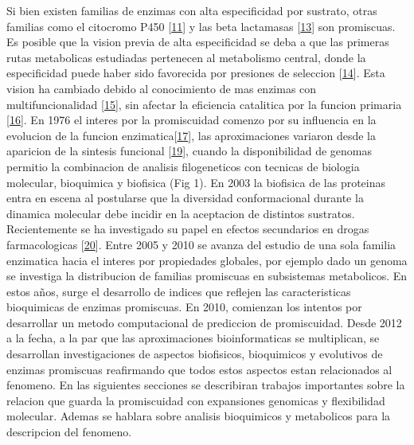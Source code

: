 \documentclass[12pt,twoside]{reedthesis}
\begin{document}
  Si bien existen familias de enzimas con alta especificidad por sustrato,
  otras familias como el citocromo P450
  {[}\protect\hyperlink{ref-bloom_neutral_2007}{11}{]} y las beta
  lactamasas {[}\protect\hyperlink{ref-zou_evolution_2015}{13}{]} son
  promiscuas. Es posible que la vision previa de alta especificidad se
  deba a que las primeras rutas metabolicas estudiadas pertenecen al
  metabolismo central, donde la especificidad puede haber sido favorecida
  por presiones de seleccion
  {[}\protect\hyperlink{ref-firn_darwinian_2009}{14}{]}. Esta vision ha
  cambiado debido al conocimiento de mas enzimas con multifuncionalidad
  {[}\protect\hyperlink{ref-jia_multifunctional_2013}{15}{]}, sin afectar
  la eficiencia catalitica por la funcion primaria
  {[}\protect\hyperlink{ref-aharoni_evolvability_2005}{16}{]}. En 1976 el
  interes por la promiscuidad comenzo por su influencia en la evolucion de
  la funcion
  enzimatica{[}\protect\hyperlink{ref-jensen_enzyme_1976}{17}{]}, las
  aproximaciones variaron desde la aparicion de la sintesis funcional
  {[}\protect\hyperlink{ref-dean_mechanistic_2007}{19}{]}, cuando la
  disponibilidad de genomas permitio la combinacion de analisis
  filogeneticos con tecnicas de biologia molecular, bioquimica y biofisica
  (Fig 1). En 2003 la biofisica de las proteinas entra en escena al
  postularse que la diversidad conformacional durante la dinamica
  molecular debe incidir en la aceptacion de distintos sustratos.
  Recientemente se ha investigado su papel en efectos secundarios en
  drogas farmacologicas
  {[}\protect\hyperlink{ref-nobeli_protein_2009}{20}{]}. Entre 2005 y 2010
  se avanza del estudio de una sola familia enzimatica hacia el interes
  por propiedades globales, por ejemplo dado un genoma se investiga la
  distribucion de familias promiscuas en subsistemas metabolicos. En estos
  años, surge el desarrollo de indices que reflejen las caracteristicas
  bioquimicas de enzimas promiscuas. En 2010, comienzan los intentos por
  desarrollar un metodo computacional de prediccion de promiscuidad. Desde
  2012 a la fecha, a la par que las aproximaciones bioinformaticas se
  multiplican, se desarrollan investigaciones de aspectos biofisicos,
  bioquimicos y evolutivos de enzimas promiscuas reafirmando que todos
  estos aspectos estan relacionados al fenomeno. En las siguientes
  secciones se describiran trabajos importantes sobre la relacion que
  guarda la promiscuidad con expansiones genomicas y flexibilidad
  molecular. Ademas se hablara sobre analisis bioquimicos y metabolicos
  para la descripcion del fenomeno.
  
\end{document}

